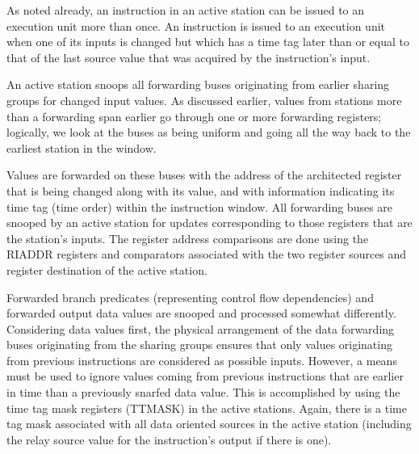 \documentclass[10pt,dvips]{article}
\begin{document}
As noted already, an instruction in an active station can be issued to
an execution unit more than once.  An instruction is issued to an execution
unit when one of its inputs is changed but which has a time tag
later than or equal to that of the last source value
that was acquired by the instruction's input.

An
active station snoops all forwarding buses originating from earlier
sharing groups for changed input values.  As discussed earlier,
values from stations more than a forwarding span earlier go through
one or more forwarding registers; logically, we look at the buses as
being uniform and going all the way back to the earliest station in the
window.

Values are forwarded on these
buses with the address of the architected register that is being
changed along with its value, and with information indicating its
time tag (time order) within the instruction window.  All forwarding
buses are snooped by an active station for updates corresponding to
those registers that are the station's inputs.
The register address comparisons
are done using the RIADDR registers and comparators associated with the
two register sources and register destination of the active station.

Forwarded branch predicates (representing control flow dependencies)
and forwarded output data values are snooped and processed somewhat
differently.  Considering data values first,
the physical arrangement of the data forwarding
buses originating from the sharing groups ensures that
only values originating from
previous instructions are considered as possible inputs.  However, a
means must be used to ignore values coming from previous instructions that
are earlier in time than a previously snarfed data value.  This is
accomplished by using the time tag mask registers (TTMASK) in the
active stations.  Again, there is a time tag mask associated with all
data oriented sources in the active station (including the relay source
value for the instruction's output if there is one).
\end{document}
